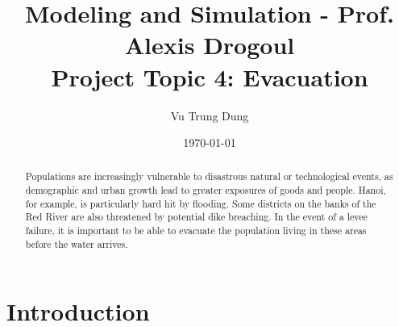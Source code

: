 \documentclass[11pt,a4paper]{article}
\begin{document}
\title{\textbf{Modeling and Simulation - Prof. Alexis Drogoul\\Project Topic 4: Evacuation}}

\author{Vu Trung Dung}
\date{\today}
\maketitle


\begin{abstract}

\begin{addmargin}[3em]{1em}
\centering
Populations are increasingly vulnerable to disastrous natural or technological events, as demographic and urban growth lead to greater exposures of goods and people. Hanoi, for example, is particularly hard hit by flooding. Some districts on the banks of the Red River are also threatened by potential dike breaching. In the event of a levee failure, it is important to be able to evacuate the population living in these areas before the water arrives.
\end{addmargin}

\end{abstract}

\section{Introduction}
\end{document}

